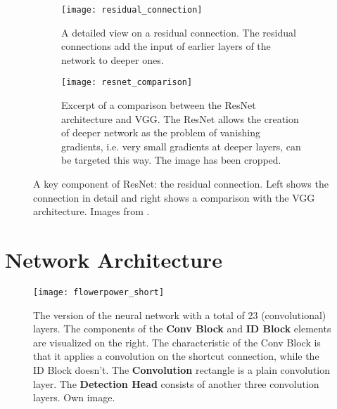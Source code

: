 \begin{figure}[!tbp]
	\centering
	\begin{subfigure}[t]{0.47\textwidth}
		\centering
    	\texttt{[image: residual\_connection]}
    	\caption{A detailed view on a residual connection. The residual connections add the input of earlier layers of the network to deeper ones.}
    	\label{fig:residual_connection}
	\end{subfigure}
	\hfill
	\begin{subfigure}[t]{0.47\textwidth}
		\centering
    	\texttt{[image: resnet\_comparison]}
    	\caption{Excerpt of a comparison between the ResNet architecture and VGG. The ResNet allows the creation of deeper network as the problem of vanishing gradients, i.e. very small gradients at deeper layers, can be targeted this way. The image has been cropped.}
    	\label{fig:resnet_comparison}
	\end{subfigure}
	\caption{A key component of ResNet: the residual connection. Left shows the connection in detail and right shows a comparison with the VGG architecture. Images from \cite{resnet}.}
	\label{fig:resnet_details}
\end{figure} 

\section{Network Architecture}

\begin{figure}[!tbp]
	\centering
    \texttt{[image: flowerpower\_short]}
    \caption{The version of the neural network with a total of 23 (convolutional) layers. The components of the \textbf{Conv Block} and \textbf{ID Block} elements are visualized on the right. The characteristic of the Conv Block is that it applies a convolution on the shortcut connection, while the ID Block doesn't. The \textbf{Convolution} rectangle is a plain convolution layer. The \textbf{Detection Head} consists of another three convolution layers. Own image.}
    	\label{fig:network_architecture}
\end{figure}


